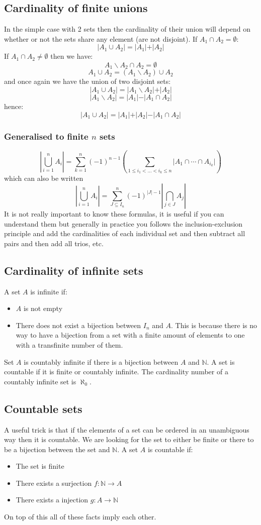 \documentclass[12pt]{article}
\begin{document}
\subsection*{Cardinality of finite unions}
In the simple case with 2 sets then the cardinality of their union will depend on whether or not the sets share any element (are not disjoint). If \(A_1\cap A_2=\emptyset\):
\[\vert A_1\cup A_2\vert=\vert A_1\vert+\vert A_2\vert\]
If \(A_1\cap A_2\ne\emptyset\) then we have:
\[A_1\backslash A_2\cap A_2=\emptyset\]
\[A_1\cup A_2=(A_1\backslash A_2)\cup A_2\]
and once again we have the union of two disjoint sets:
\[\vert A_1\cup A_2\vert=\vert A_1\backslash A_2\vert +\vert A_2\vert\]
\[\vert A_1\backslash A_2\vert=\vert A_1\vert -\vert A_1\cap A_2\vert\]
hence:
\[\vert A_1\cup A_2\vert=\vert A_1\vert + \vert A_2\vert -\vert A_1\cap A_2\vert\]
\subsubsection*{Generalised to finite \(n\) sets}
\[\left|\bigcup_{i=1}^nA_i\right|=\sum_{k=1}^n(-1)^{n-1}\left(\sum_{1\leq i_1<\dots<i_k\leq n}\vert A_1\cap\cdots\cap A_{i_k}\vert\right)\]
which can also be written
\[\left|\bigcup_{i=1}^nA_i\right|=\sum_{J\subseteq I_n}^n(-1)^{\vert J\vert-1}\left|\bigcap_{j\in J}A_j\right|\]
It is not really important to know these formulas, it is useful if you can understand them but generally in practice you follows the inclusion-exclusion principle and add the cardinalities of each individual set and then subtract all pairs and then add all trios, etc.
\subsection*{Cardinality of infinite sets}
A set \(A\) is infinite if:
\begin{itemize}
    \item \(A\) is not empty
    \item There does not exist a bijection between \(I_n\) and \(A\). This is because there is no way to have a bijection from a set with a finite amount of elements to one with a transfinite number of them.
\end{itemize}
Set \(A\) is countably infinite if there is a bijection between \(A\) and \(\mathbb{N}\). A set is countable if it is finite or countably infinite. The cardinality number of a countably infinite set is \(\aleph_0\).
\subsection*{Countable sets}
A useful trick is that if the elements of a set can be ordered in an unambiguous way then it is countable. We are looking for the set to either be finite or there to be a bijection between the set and \(\mathbb{N}\). A set \(A\) is countable if:
\begin{itemize}
    \item The set is finite
    \item There exists a surjection \(f:\mathbb{N}\to A\)
    \item There exists a injection \(g:A\to \mathbb{N}\)
\end{itemize}
On top of this all of these facts imply each other.
\end{document}
